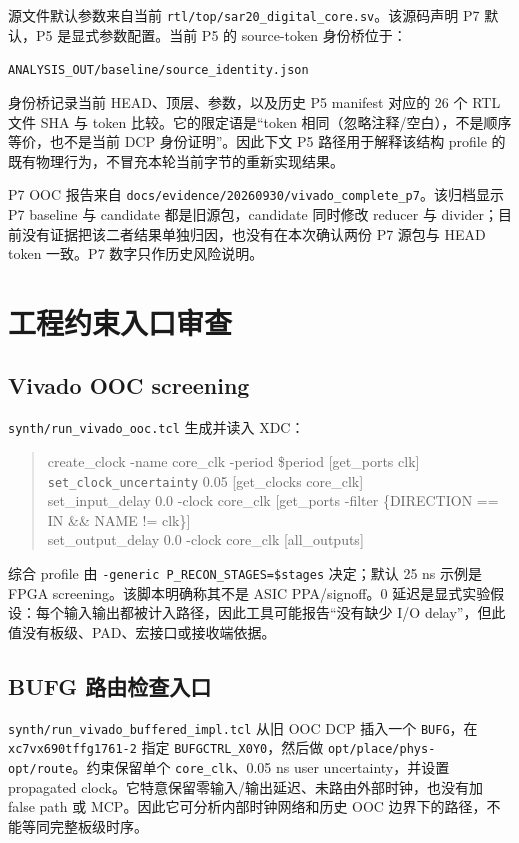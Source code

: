 \documentclass[UTF8,fontset=fandol,10pt,a4paper,openany]{ctexrep}
\newcommand{\code}[1]{\nolinkurl{#1}}
\begin{document}
源文件默认参数来自当前 \code{rtl/top/sar20_digital_core.sv}。该源码声明 P7 默认，P5 是显式参数配置。当前 P5 的 source-token 身份桥位于：


\code{ANALYSIS_OUT/baseline/source_identity.json}


身份桥记录当前 HEAD、顶层、参数，以及历史 P5 manifest 对应的 26 个 RTL 文件 SHA 与 token 比较。它的限定语是“token 相同（忽略注释/空白），不是顺序等价，也不是当前 DCP 身份证明”。因此下文 P5 路径用于解释该结构 profile 的既有物理行为，不冒充本轮当前字节的重新实现结果。


P7 OOC 报告来自 \code{docs/evidence/20260930/vivado_complete_p7}。该归档显示 P7 baseline 与 candidate 都是旧源包，candidate 同时修改 reducer 与 divider；目前没有证据把该二者结果单独归因，也没有在本次确认两份 P7 源包与 HEAD token 一致。P7 数字只作历史风险说明。


\section{工程约束入口审查}


\subsection{Vivado OOC screening}


\code{synth/run_vivado_ooc.tcl} 生成并读入 XDC：


\begin{quote}\small\ttfamily\raggedright
create\_clock -name core\_clk -period \$period [get\_ports clk]\\\code{set_clock_uncertainty} 0.05 [get\_clocks core\_clk]\\set\_input\_delay 0.0 -clock core\_clk [get\_ports -filter \{DIRECTION == IN \&\& NAME != clk\}]\\set\_output\_delay 0.0 -clock core\_clk [all\_outputs]
\end{quote}


综合 profile 由 \code{-generic P_RECON_STAGES=$stages} 决定；默认 25 ns 示例是 FPGA screening。该脚本明确称其不是 ASIC PPA/signoff。0 延迟是显式实验假设：每个输入输出都被计入路径，因此工具可能报告“没有缺少 I/O delay”，但此值没有板级、PAD、宏接口或接收端依据。


\subsection{BUFG 路由检查入口}


\code{synth/run_vivado_buffered_impl.tcl} 从旧 OOC DCP 插入一个 \code{BUFG}，在 \code{xc7vx690tffg1761-2} 指定 \code{BUFGCTRL_X0Y0}，然后做 \code{opt/place/phys-opt/route}。约束保留单个 \code{core_clk}、0.05 ns user uncertainty，并设置 propagated clock。它特意保留零输入/输出延迟、未路由外部时钟，也没有加 false path 或 MCP。因此它可分析内部时钟网络和历史 OOC 边界下的路径，不能等同完整板级时序。
\end{document}
